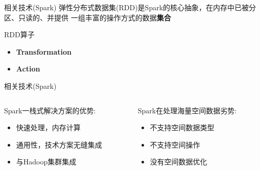 \begin{frame}[t]{相关技术(Spark)}
    弹性分布式数据集(RDD)是Spark的核心抽象，在内存中已被分区、只读的、并提供
    一组丰富的操作方式的数据\textbf{集合}

    \vspace{2em}
    \pause
    \alert{RDD算子}
    \begin{itemize}
        \item \textbf{Transformation} 
        \item \textbf{Action}
    \end{itemize}

\end{frame}

\begin{frame}[c]{相关技术(Spark)}
    \begin{columns}
        \begin{column}{0.5 \textwidth}
            Spark一栈式解决方案的\alert{优势:}
            
            \vspace{0.5em}
            \begin{itemize}
                \item 快速处理，内存计算
                \item 通用性，技术方案无缝集成
                \item 与Hadoop集群集成
            \end{itemize}
        \end{column}

        \pause
        \begin{column}{0.5 \textwidth}
            Spark在处理海量空间数据\alert{劣势:}

            \vspace{0.5em}
            \begin{itemize}
                \item 不支持空间数据类型
                \item 不支持空间操作
                \item 没有空间数据优化
            \end{itemize}
        \end{column}
    \end{columns}

\end{frame}


